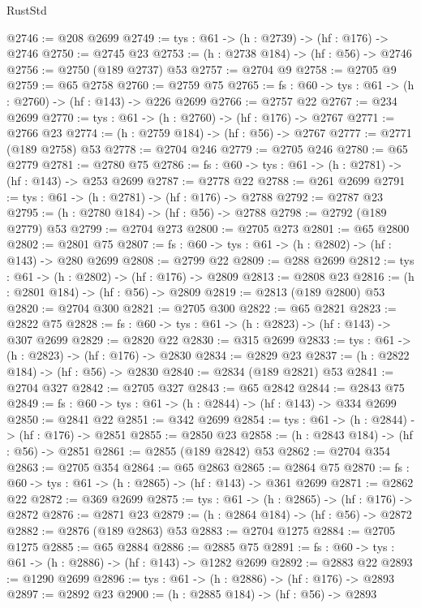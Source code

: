\begin{lexlean}{RustStd}
\begin{coremodule}
{\begin{coremodule}
{{{{{{{{{{{{{{{{{{{{{@2746 := @208 @2699
@2749 := {tys : @61} -> (h : @2739) -> (hf : @176) -> @2746
@2750 := @2745 @23
@2753 := (h : @2738 @184) -> (hf : @56) -> @2746
@2756 := @2750 (@189 @2737) @53
@2757 := @2704 @9
@2758 := @2705 @9
@2759 := @65 @2758
@2760 := @2759 @75
@2765 := {fs : @60} -> {tys : @61} -> (h : @2760) -> (hf : @143) -> @226 @2699
@2766 := @2757 @22
@2767 := @234 @2699
@2770 := {tys : @61} -> (h : @2760) -> (hf : @176) -> @2767
@2771 := @2766 @23
@2774 := (h : @2759 @184) -> (hf : @56) -> @2767
@2777 := @2771 (@189 @2758) @53
@2778 := @2704 @246
@2779 := @2705 @246
@2780 := @65 @2779
@2781 := @2780 @75
@2786 := {fs : @60} -> {tys : @61} -> (h : @2781) -> (hf : @143) -> @253 @2699
@2787 := @2778 @22
@2788 := @261 @2699
@2791 := {tys : @61} -> (h : @2781) -> (hf : @176) -> @2788
@2792 := @2787 @23
@2795 := (h : @2780 @184) -> (hf : @56) -> @2788
@2798 := @2792 (@189 @2779) @53
@2799 := @2704 @273
@2800 := @2705 @273
@2801 := @65 @2800
@2802 := @2801 @75
@2807 := {fs : @60} -> {tys : @61} -> (h : @2802) -> (hf : @143) -> @280 @2699
@2808 := @2799 @22
@2809 := @288 @2699
@2812 := {tys : @61} -> (h : @2802) -> (hf : @176) -> @2809
@2813 := @2808 @23
@2816 := (h : @2801 @184) -> (hf : @56) -> @2809
@2819 := @2813 (@189 @2800) @53
@2820 := @2704 @300
@2821 := @2705 @300
@2822 := @65 @2821
@2823 := @2822 @75
@2828 := {fs : @60} -> {tys : @61} -> (h : @2823) -> (hf : @143) -> @307 @2699
@2829 := @2820 @22
@2830 := @315 @2699
@2833 := {tys : @61} -> (h : @2823) -> (hf : @176) -> @2830
@2834 := @2829 @23
@2837 := (h : @2822 @184) -> (hf : @56) -> @2830
@2840 := @2834 (@189 @2821) @53
@2841 := @2704 @327
@2842 := @2705 @327
@2843 := @65 @2842
@2844 := @2843 @75
@2849 := {fs : @60} -> {tys : @61} -> (h : @2844) -> (hf : @143) -> @334 @2699
@2850 := @2841 @22
@2851 := @342 @2699
@2854 := {tys : @61} -> (h : @2844) -> (hf : @176) -> @2851
@2855 := @2850 @23
@2858 := (h : @2843 @184) -> (hf : @56) -> @2851
@2861 := @2855 (@189 @2842) @53
@2862 := @2704 @354
@2863 := @2705 @354
@2864 := @65 @2863
@2865 := @2864 @75
@2870 := {fs : @60} -> {tys : @61} -> (h : @2865) -> (hf : @143) -> @361 @2699
@2871 := @2862 @22
@2872 := @369 @2699
@2875 := {tys : @61} -> (h : @2865) -> (hf : @176) -> @2872
@2876 := @2871 @23
@2879 := (h : @2864 @184) -> (hf : @56) -> @2872
@2882 := @2876 (@189 @2863) @53
@2883 := @2704 @1275
@2884 := @2705 @1275
@2885 := @65 @2884
@2886 := @2885 @75
@2891 := {fs : @60} -> {tys : @61} -> (h : @2886) -> (hf : @143) -> @1282 @2699
@2892 := @2883 @22
@2893 := @1290 @2699
@2896 := {tys : @61} -> (h : @2886) -> (hf : @176) -> @2893
@2897 := @2892 @23
@2900 := (h : @2885 @184) -> (hf : @56) -> @2893
}}}}}}}}}}}}}}}}}}}}}
\end{coremodule}}
\end{coremodule}
\end{lexlean}
